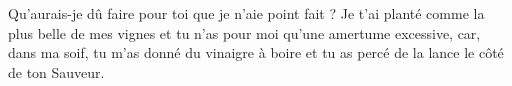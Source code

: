 Qu’aurais-je dû faire pour toi que je n’aie point fait ? Je t’ai planté comme la plus belle de mes vignes et tu n’as pour moi qu’une amertume excessive, car, dans ma soif, tu m’as donné du vinaigre à boire et tu as percé de la lance le côté de ton Sauveur.